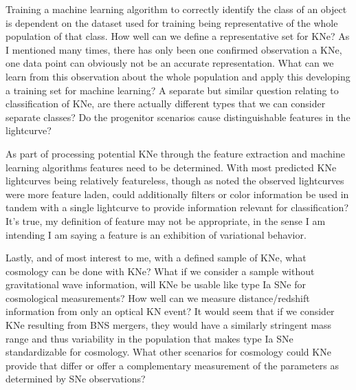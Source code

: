 \documentclass[12pt]{article}
\begin{document}
Training a machine learning algorithm to correctly identify the class of an object is dependent on the dataset used for training being representative of the whole population of that class. How well can we define a representative set for KNe? As I mentioned many times, there has only been one confirmed observation a KNe, one data point can obviously not be an accurate representation. What can we learn from this observation about the whole population and apply this developing a training set for machine learning? A separate but similar question relating to classification of KNe, are there actually different types that we can consider separate classes? Do the progenitor scenarios cause distinguishable features in the lightcurve? \par
As part of processing potential KNe through the feature extraction and machine learning algorithms features need to be determined. With most predicted KNe lightcurves being relatively featureless, though as noted the observed lightcurves were more feature laden, could additionally filters or color information be used in tandem with a single lightcurve to provide information relevant for classification? It's true, my definition of feature may not be appropriate, in the sense I am intending I am saying a feature is an exhibition of variational behavior. \par
Lastly, and of most interest to me, with a defined sample of KNe, what cosmology can be done with KNe? What if we consider a sample without gravitational wave information, will KNe be usable like type Ia SNe for cosmological measurements? How well can we measure distance/redshift information from only an optical KN event? It would seem that if we consider KNe resulting from BNS mergers, they would have a similarly stringent mass range and thus variability in the population that makes type Ia SNe standardizable for cosmology. What other scenarios for cosmology could KNe provide that differ or offer a complementary measurement of the parameters as determined by SNe observations? \par



\end{document}
